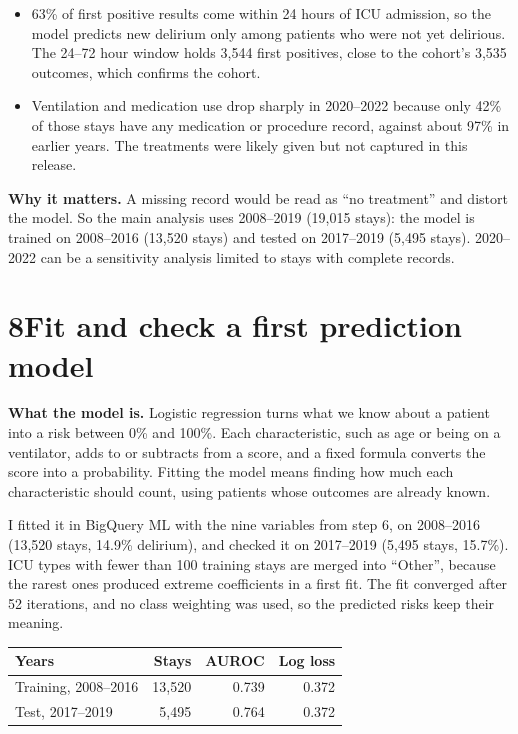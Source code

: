 \documentclass[11pt]{article}
\newcommand{\why}[1]{\begin{whynote}\textbf{\color{accent}Why it matters.} #1\end{whynote}}
\newcommand{\step}[2]{\section*{\color{accent}#1\quad\color{black}#2}}
\begin{document}
\begin{itemize}
	\item 63\% of first positive results come within 24 hours of ICU admission, so the model predicts new delirium only among patients who were not yet delirious. The 24--72 hour window holds 3,544 first positives, close to the cohort's 3,535 outcomes, which confirms the cohort.
	\item Ventilation and medication use drop sharply in 2020--2022 because only 42\% of those stays have any medication or procedure record, against about 97\% in earlier years. The treatments were likely given but not captured in this release.
\end{itemize}

\why{A missing record would be read as ``no treatment'' and distort the model. So the main analysis uses 2008--2019 (19,015 stays): the model is trained on 2008--2016 (13,520 stays) and tested on 2017--2019 (5,495 stays). 2020--2022 can be a sensitivity analysis limited to stays with complete records.}

\step{8}{Fit and check a first prediction model}

\textbf{What the model is.} Logistic regression turns what we know about a patient into a risk between 0\% and 100\%. Each characteristic, such as age or being on a ventilator, adds to or subtracts from a score, and a fixed formula converts the score into a probability. Fitting the model means finding how much each characteristic should count, using patients whose outcomes are already known.

I fitted it in BigQuery ML with the nine variables from step 6, on 2008--2016 (13,520 stays, 14.9\% delirium), and checked it on 2017--2019 (5,495 stays, 15.7\%). ICU types with fewer than 100 training stays are merged into ``Other'', because the rarest ones produced extreme coefficients in a first fit. The fit converged after 52 iterations, and no class weighting was used, so the predicted risks keep their meaning.

\begin{center}
\begin{tabular}{l r r r}
	\toprule
	Years & Stays & AUROC & Log loss \\
	\midrule
	Training, 2008--2016 & 13,520 & 0.739 & 0.372 \\
	Test, 2017--2019 & 5,495 & 0.764 & 0.372 \\
	\bottomrule
\end{tabular}
\end{center}
\end{document}
